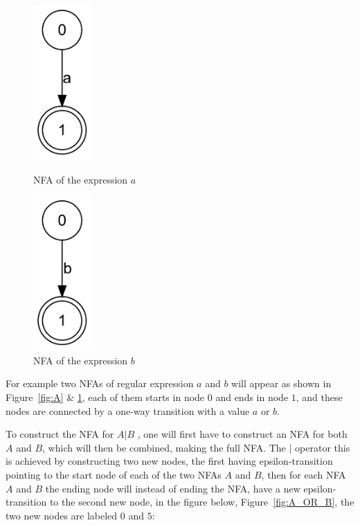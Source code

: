 \begin{figure}[h!]
\begin{minipage}[b]{0.40\linewidth}
  \centering
      \includegraphics[width=0.2\textwidth]{lib/A.png}
  \caption{NFA of the expression $a$}
\label{fig:A}
  \end{minipage}
\begin{minipage}[b]{0.40\linewidth}

  \centering
      \includegraphics[width=0.2\textwidth]{lib/B.png}
  \caption{NFA of the expression $b$}
  \label{fig:B}

    \end{minipage}
\end{figure}


For example two NFAs of regular expression $a$ and $b$ will appear as shown in Figure~\ref{fig:A} \& \ref{fig:B}, each of them starts in node $0$ and ends in node $1$, and these nodes are connected by a one-way transition with a value $a$ or $b$. %

To construct the NFA for $A | B$ , one will first have to construct an NFA for both $A$ and $B$, which will then be combined, making the full NFA. The $|$ operator this is achieved by constructing two new nodes, the first having epsilon-transition pointing to the start node of each of the two NFAs $A$ and $B$, then for each NFA $A$ and $B$ the ending node will instead of ending the NFA, have a new epsilon-transition to the second new node, in the figure below, Figure~\ref{fig:A_OR_B}, the two new nodes are labeled $0$ and $5$:

